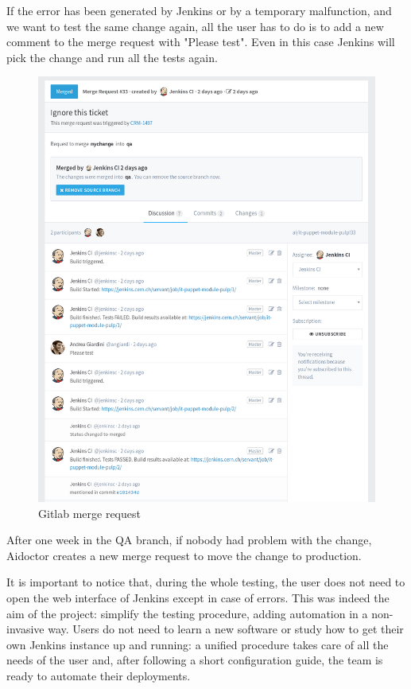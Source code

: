 If the error has been generated by Jenkins or by a temporary malfunction,
and we want to test the same change again, all the user has to do is to
add a new comment to the merge request with "Please test". Even in this
case Jenkins will pick the change and run all the tests again.

\begin{figure}[H]
\includegraphics[width=\textwidth,height=\textheight,keepaspectratio]{ContinuousIntegrationWithJenkins/images/gitlab_merge_to_qa.jpg}
\caption{Gitlab merge request}
\end{figure}

After one week in the QA branch, if nobody had problem with the change,
Aidoctor creates a new merge request to move the change to production.

It is important to notice that, during the whole testing, the user does not
need to open the web interface of Jenkins except in case of errors. This was
indeed the aim of the project: simplify the testing procedure, adding
automation in a non-invasive way. Users do not need to learn a new software or
study how to get their own Jenkins instance up and running: a unified procedure
takes care of all the needs of the user and, after following a short
configuration guide, the team is ready to automate their deployments.
